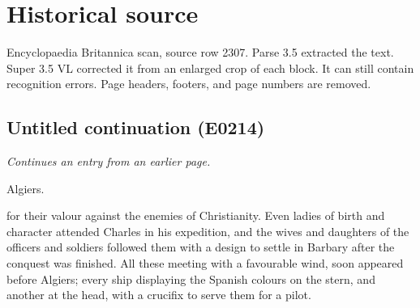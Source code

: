 \documentclass{article}
\begin{document}
\section*{Historical source}
Encyclopaedia Britannica scan, source row 2307. Parse 3.5 extracted the text. Super 3.5 VL corrected it from an enlarged crop of each block. It can still contain recognition errors.
Page headers, footers, and page numbers are removed.

\subsection*{Untitled continuation (E0214)}
\textit{Continues an entry from an earlier page.}

Algiers.

for their valour against the enemies of Christianity. Even ladies of birth and character attended Charles in his expedition, and the wives and daughters of the officers and soldiers followed them with a design to settle in Barbary after the conquest was finished. All these meeting with a favourable wind, soon appeared before Algiers; every ship displaying the Spanish colours on the stern, and another at the head, with a crucifix to serve them for a pilot.
\end{document}
